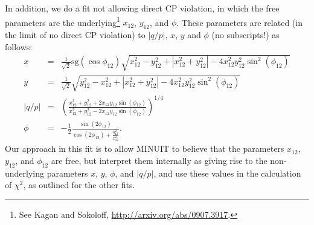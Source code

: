 In addition, we do a fit not allowing direct CP violation, in which the
free parameters are the underlying\footnote{See Kagan and Sokoloff, \url{http://arxiv.org/abs/0907.3917}.}
$x_{12}$, $y_{12}$, and $\phi$. These parameters are related
(in the limit of no direct CP violation) to $|q/p|$, $x$, $y$ and $\phi$ (no subscripts!) as follows:
\begin{eqnarray}
x &=& \frac{1}{\sqrt{2}}\mathrm{sg}(\cos\phi_{12})
\sqrt{x_{12}^2 - y_{12}^2 + |x_{12}^2+y_{12}^2| - 4x_{12}^2y_{12}^2\sin^2(\phi_{12})} \\
%
y &=& \frac{1}{\sqrt{2}}
\sqrt{y_{12}^2 - x_{12}^2 + |x_{12}^2+y_{12}^2| - 4x_{12}^2y_{12}^2\sin^2(\phi_{12})} \\
%
|q/p| &=& \left(\frac{x_{12}^2+y_{12}^2+2x_{12}y_{12}\sin(\phi_{12})}
{x_{12}^2+y_{12}^2-2x_{12}y_{12}\sin(\phi_{12})}\right)^{1/4}\\
%
\phi &=& -\frac{1}{2}\frac{\sin(2\phi_{12})}{\cos(2\phi_{12})+\frac{y_{12}^2}{x_{12}^2}}.
\end{eqnarray}
Our approach in this fit is to allow MINUIT to believe that the parameters $x_{12}$, $y_{12}$,
and $\phi_{12}$ are free, but interpret them internally as giving rise to the 
non-underlying parameters $x$, $y$, $\phi$, and $|q/p|$, and use these
values in the calculation of $\chi^2$, as outlined for the other fits. 

